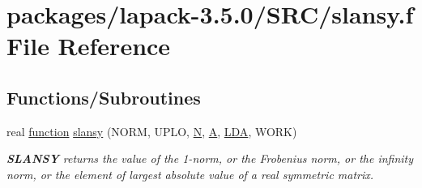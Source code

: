 \hypertarget{slansy_8f}{}\section{packages/lapack-\/3.5.0/\+S\+R\+C/slansy.f File Reference}
\label{slansy_8f}
\subsection*{Functions/\+Subroutines}
\begin{DoxyCompactItemize}
\item 
real \hyperlink{afunc_8m_a7b5e596df91eadea6c537c0825e894a7}{function} \hyperlink{group__realSYauxiliary_ga611e1beaaad792e0753a47723c8380ed}{slansy} (N\+O\+R\+M, U\+P\+L\+O, \hyperlink{polmisc_8c_a0240ac851181b84ac374872dc5434ee4}{N}, \hyperlink{classA}{A}, \hyperlink{example__user_8c_ae946da542ce0db94dced19b2ecefd1aa}{L\+D\+A}, W\+O\+R\+K)
\begin{DoxyCompactList}\small\item\em {\bfseries S\+L\+A\+N\+S\+Y} returns the value of the 1-\/norm, or the Frobenius norm, or the infinity norm, or the element of largest absolute value of a real symmetric matrix. \end{DoxyCompactList}\end{DoxyCompactItemize}

